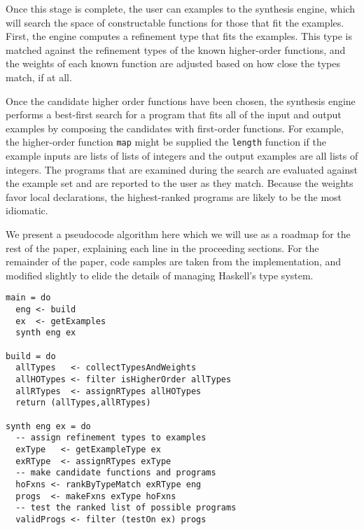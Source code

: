 Once this stage is complete, the user can examples to the synthesis engine, which will search the space of constructable functions for those that fit the examples. First, the engine computes a refinement type that fits the examples. This type is matched against the refinement types of the known higher-order functions, and the weights of each known function are adjusted based on how close the types match, if at all.

Once the candidate higher order functions have been chosen, the synthesis engine performs a best-first search for a program that fits all of the input and output examples by composing the candidates with first-order functions. For example, the higher-order function \texttt{map} might be supplied the \texttt{length} function if the example inputs are lists of lists of integers and the output examples are all lists of integers. The programs that are examined during the search are evaluated against the example set and are reported to the user as they match. Because the weights favor local declarations, the highest-ranked programs are likely to be the most idiomatic.

We present a pseudocode algorithm here which we will use as a roadmap for the rest of the paper, explaining each line in the proceeding sections. For the remainder of the paper, code samples are taken from the implementation, and modified slightly to elide the details of managing Haskell's type system.
 
\begin{lstlisting}[caption=A pseudocode representation of the build and synthesis stages of the synthesis algorithm, label=listing:Algo]
main = do
  eng <- build
  ex  <- getExamples
  synth eng ex
  
build = do
  allTypes   <- collectTypesAndWeights
  allHOTypes <- filter isHigherOrder allTypes
  allRTypes  <- assignRTypes allHOTypes
  return (allTypes,allRTypes)
  
synth eng ex = do
  -- assign refinement types to examples
  exType   <- getExampleType ex
  exRType  <- assignRTypes exType
  -- make candidate functions and programs
  hoFxns <- rankByTypeMatch exRType eng
  progs  <- makeFxns exType hoFxns
  -- test the ranked list of possible programs
  validProgs <- filter (testOn ex) progs
\end{lstlisting}
